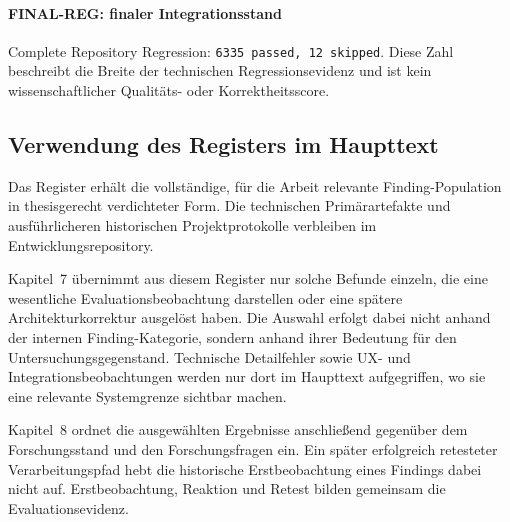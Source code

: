\paragraph{FINAL-REG: finaler Integrationsstand}
Complete Repository Regression: \texttt{6335 passed, 12 skipped}. Diese Zahl
beschreibt die Breite der technischen Regressionsevidenz und ist kein
wissenschaftlicher Qualitäts- oder Korrektheitsscore.

\subsection{Verwendung des Registers im Haupttext}

Das Register erhält die vollständige, für die Arbeit relevante
Finding-Population in thesisgerecht verdichteter Form. Die technischen
Primärartefakte und ausführlicheren historischen Projektprotokolle verbleiben
im Entwicklungsrepository.

Kapitel~7 übernimmt aus diesem Register nur solche Befunde einzeln, die eine
wesentliche Evaluationsbeobachtung darstellen oder eine spätere
Architekturkorrektur ausgelöst haben. Die Auswahl erfolgt dabei nicht anhand
der internen Finding-Kategorie, sondern anhand ihrer Bedeutung für den
Untersuchungsgegenstand. Technische Detailfehler sowie UX- und
Integrationsbeobachtungen werden nur dort im Haupttext aufgegriffen, wo sie
eine relevante Systemgrenze sichtbar machen.

Kapitel~8 ordnet die ausgewählten Ergebnisse anschließend gegenüber dem
Forschungsstand und den Forschungsfragen ein. Ein später erfolgreich
retesteter Verarbeitungspfad hebt die historische Erstbeobachtung eines
Findings dabei nicht auf. Erstbeobachtung, Reaktion und Retest bilden
gemeinsam die Evaluationsevidenz.
